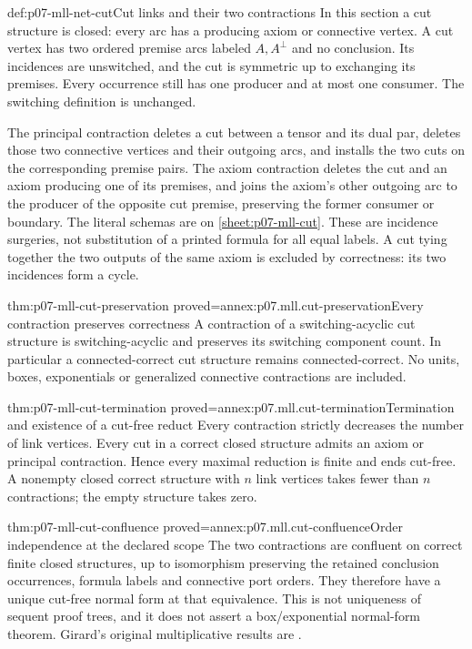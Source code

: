 \begin{hbdefinition}{def:p07-mll-net-cut}{Cut links and their two contractions}
In this section a cut structure is closed: every arc has a producing
axiom or connective vertex. A cut vertex has two ordered premise arcs labeled \(A,A^\perp\) and
no conclusion. Its incidences are unswitched, and the cut is symmetric
up to exchanging its premises. Every occurrence still has one producer
and at most one consumer. The switching definition is unchanged.

The principal contraction deletes a cut between a tensor and its dual
par, deletes those two connective vertices and their outgoing arcs,
and installs the two cuts on the corresponding premise pairs.
The axiom contraction deletes the cut and an axiom producing one of
its premises, and joins the axiom's other outgoing arc to the producer
of the opposite cut premise, preserving the former consumer or boundary.
The literal schemas are on \cref{sheet:p07-mll-cut}.
These are incidence surgeries, not substitution of a printed formula
for all equal labels. A cut tying together the two outputs of the
same axiom is excluded by correctness: its two incidences form a cycle.
\end{hbdefinition}

\begin{hbtheorem}{thm:p07-mll-cut-preservation}
 {proved=annex:p07.mll.cut-preservation}{Every contraction preserves correctness}
A contraction of a switching-acyclic cut structure is switching-acyclic
and preserves its switching component count. In particular a
connected-correct cut structure remains connected-correct. No units,
boxes, exponentials or generalized connective contractions are included.
\end{hbtheorem}

\begin{hbtheorem}{thm:p07-mll-cut-termination}
 {proved=annex:p07.mll.cut-termination}{Termination and existence of a cut-free reduct}
Every contraction strictly decreases the number of link vertices.
Every cut in a correct closed structure admits an axiom or principal
contraction. Hence every maximal reduction is finite and ends cut-free.
A nonempty closed correct structure with \(n\) link vertices takes fewer
than \(n\) contractions; the empty structure takes zero.
\end{hbtheorem}

\begin{hbtheorem}{thm:p07-mll-cut-confluence}
 {proved=annex:p07.mll.cut-confluence}{Order independence at the declared scope}
The two contractions are confluent on correct finite closed structures, up to
isomorphism preserving the retained conclusion occurrences, formula
labels and connective port orders. They therefore have a unique
cut-free normal form at that equivalence. This is not uniqueness of
sequent proof trees, and it does not assert a box/exponential normal-form
theorem. Girard's original multiplicative results are
\cite[Propositions~2.10--2.11 and Theorem~2.12, pp.~41--43]
{Girard1987AuthorHosted}.
\end{hbtheorem}

